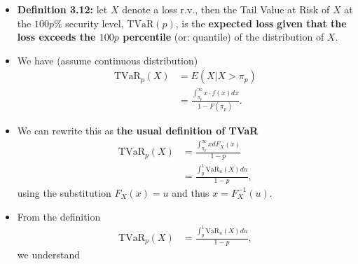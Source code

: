 \documentclass[]{book}
\begin{document}
\begin{itemize}
\item
  \textbf{Definition 3.12:} let \(X\) denote a loss r.v., then the Tail
  Value at Risk of \(X\) at the \(100p\%\) security level,
  \(\text{TVaR}(p)\), is the \textbf{expected loss} \textbf{given that
  the loss exceeds the \(100p\) percentile} (or: quantile) of the
  distribution of \(X\).
\item
  We have (assume continuous distribution) \[\begin{aligned}
  \text{TVaR}_p(X) &= E(X|X>\pi_p) \\
  &= \frac{\int_{\pi_p}^{\infty} x\cdot f(x) dx}{1-F(\pi_p)}.\end{aligned}\]
\item
  We can rewrite this as \textbf{the usual definition of TVaR}
  \[\begin{aligned}
  \text{TVaR}_p(X) &= \frac{\int_{\pi_p}^{\infty} x dF_X(x)}{1-p} \\
  &= \frac{\int_p^1 \text{VaR}_u(X) du}{1-p},\end{aligned}\] using the
  substitution \(F_X(x) = u\) and thus \(x=F_X^{-1}(u)\).
\item
  From the definition \[\begin{aligned}
  \text{TVaR}_p(X) &= \frac{\int_p^1 \text{VaR}_u(X) du}{1-p},\end{aligned}\]
  we understand


\end{itemize}
\end{document}
